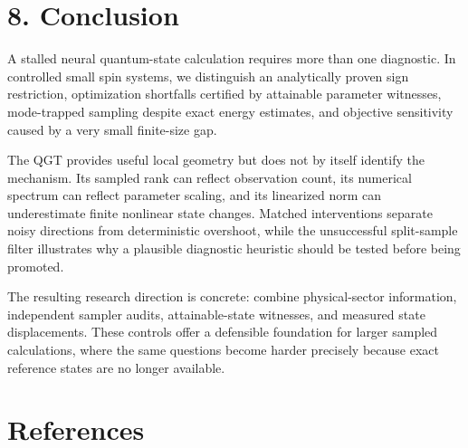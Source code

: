 \documentclass[
  11pt,
  a4paper,
]{article}
\begin{document}
\hypertarget{conclusion}{%
\section{8. Conclusion}\label{conclusion}}

A stalled neural quantum-state calculation requires more than one
diagnostic. In controlled small spin systems, we distinguish an
analytically proven sign restriction, optimization shortfalls certified
by attainable parameter witnesses, mode-trapped sampling despite exact
energy estimates, and objective sensitivity caused by a very small
finite-size gap.

The QGT provides useful local geometry but does not by itself identify
the mechanism. Its sampled rank can reflect observation count, its
numerical spectrum can reflect parameter scaling, and its linearized
norm can underestimate finite nonlinear state changes. Matched
interventions separate noisy directions from deterministic overshoot,
while the unsuccessful split-sample filter illustrates why a plausible
diagnostic heuristic should be tested before being promoted.

The resulting research direction is concrete: combine physical-sector
information, independent sampler audits, attainable-state witnesses, and
measured state displacements. These controls offer a defensible
foundation for larger sampled calculations, where the same questions
become harder precisely because exact reference states are no longer
available.

\hypertarget{references}{%
\section{References}\label{references}}
\end{document}
